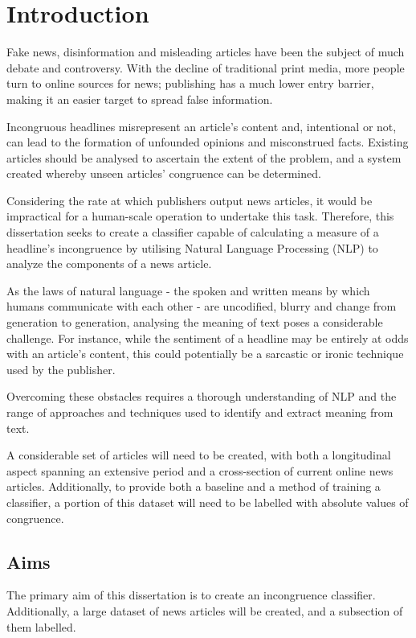 \section{Introduction}
Fake news, disinformation and misleading articles have been the subject of much debate and controversy. With the decline of traditional print media, more people turn to online sources for news; publishing has a much lower entry barrier, making it an easier target to spread false information.

Incongruous headlines misrepresent an article's content and,
intentional or not, can lead to the formation of unfounded opinions and misconstrued facts. Existing articles should be analysed to ascertain the extent of the problem, and a system created whereby unseen articles' congruence can be determined.

Considering the rate at which publishers output news articles, it would be impractical for a human-scale operation to undertake this task. Therefore, this dissertation seeks to create a classifier capable of calculating a measure of a headline's incongruence by utilising Natural Language Processing (NLP) to analyze the components of a news article.

As the laws of natural language - the spoken and written means by which humans communicate with each other - are uncodified, blurry and change from generation to generation, analysing the meaning of text poses a considerable challenge. For instance, while the sentiment of a headline may be entirely at odds with an article's content, this could potentially be a sarcastic or ironic technique used by the publisher.

Overcoming these obstacles requires a thorough understanding of NLP and the range of approaches and techniques used to identify and extract meaning from text.

A considerable set of articles will need to be created, with both a
longitudinal aspect spanning an extensive period and a cross-section of current online news articles. Additionally, to provide both a baseline and a method of training a classifier, a portion of this dataset will need to be labelled with absolute values of congruence.


\subsection{Aims}
The primary aim of this dissertation is to create an incongruence classifier. Additionally, a large dataset of news articles will be created, and a subsection of them labelled.

